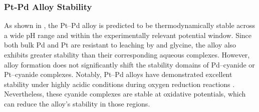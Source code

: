 \documentclass[journal=jacsat,manuscript=article]{achemso}
\begin{document}
\subsubsection{Pt-Pd Alloy Stability}
As shown in , the Pt–Pd alloy is predicted to be thermodynamically stable across a wide pH range and within the experimentally relevant potential window. Since both bulk Pd and Pt are resistant to leaching by  and glycine, the alloy also exhibits greater stability than their corresponding aqueous complexes. However, alloy formation does not significantly shift the stability domains of Pd–cyanide or Pt–cyanide complexes. Notably, Pt–Pd alloys have demonstrated excellent stability under highly acidic conditions during oxygen reduction reactions \cite{Duan2015NanoporousReaction, Koenigsmann2013TailoringSystems}. Nevertheless, these cyanide complexes are stable at oxidative potentials, which can reduce the alloy’s stability in those regions.
\end{document}

